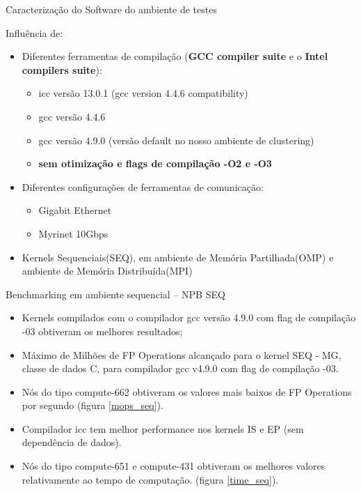 \documentclass{beamer}
\begin{document}
  \begin{frame}{Caracterização do Software do ambiente de testes}

Influência de:
\begin{itemize}

\item Diferentes ferramentas de compilação (\textbf{GCC compiler suite}	e o \textbf{ Intel compilers suite}):
\begin{itemize}
\item icc versão 13.0.1 (gcc version 4.4.6 compatibility)
\item gcc versão 4.4.6
\item gcc versão  4.9.0  (versão default no nosso ambiente de clustering)
\item \textbf{sem otimização e flags de compilação -O2 e -O3 }
 \end{itemize}
 \item Diferentes configurações de ferramentas de comunicação:
 \begin{itemize}
\item Gigabit Ethernet
\item Myrinet 10Gbps
 \end{itemize}
 \item Kernels Sequenciais(SEQ), em ambiente de Memória Partilhada(OMP) e ambiente de Memória Distribuída(MPI)

 \end{itemize}


  \end{frame}
  
   \begin{frame}{Benchmarking em ambiente sequencial -- NPB SEQ}
\begin{itemize}
\item \small Kernels compilados com o compilador gcc versão 4.9.0 com flag de compilação -03 obtiveram os melhores resultados;
\item \small Máximo de Milhões de FP Operations alcançado para o kernel SEQ - MG, classe de dados C,  para  compilador gcc v4.9.0 com flag de compilação -03.
\item \small Nós do tipo compute-662 obtiveram os valores mais baixos de FP Operations por segundo \tiny{ \color{red} (figura \ref{mops_seq})}.
\item \small Compilador icc tem melhor performance nos kernels IS e EP (sem dependência de dados).
\item \small Nós do tipo compute-651 e compute-431 obtiveram os melhores valores relativamente ao tempo de computação. \tiny{ \color{red} (figura \ref{time_seq})}.
 \end{itemize}


  \end{frame}
  
\end{document}
